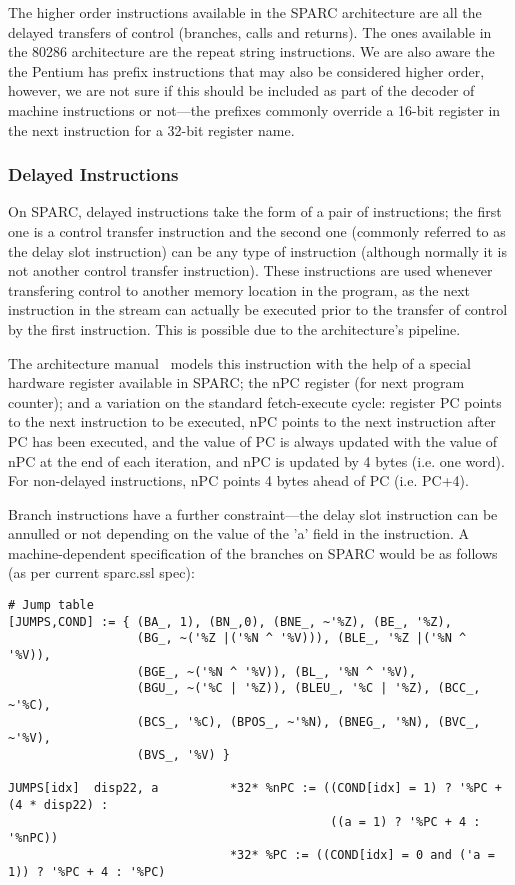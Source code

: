 The higher order instructions available in the SPARC architecture
are all the delayed transfers of control (branches, calls and 
returns).  The ones available in the 80286 architecture are the
repeat string instructions. 
We are also aware the the Pentium has prefix instructions 
that may also be considered higher order, however, we are not
sure if this should be included as part of the decoder of
machine instructions or not---the prefixes commonly override 
a 16-bit register in the next instruction for a 32-bit register
name. 


\subsubsection*{Delayed Instructions}
On SPARC, delayed instructions take the form of a pair of 
instructions; the first one is a control transfer instruction 
and the second one (commonly referred to as the delay slot instruction)
can be any type of instruction (although normally it is not another
control transfer instruction).
These instructions are used whenever transfering control to another 
memory location in the program, as the next instruction in the stream 
can actually be executed prior to the transfer of control by the first 
instruction.  This is possible due to the architecture's pipeline.

The architecture manual~\cite{Spar92} models this instruction with
the help of a special hardware register available in SPARC; the
nPC register (for next program counter); and a variation on
the standard fetch-execute cycle: register PC points to the next
instruction to be executed, nPC points to the next instruction 
after PC has been executed, and the value of PC is always updated
with the value of nPC at the end of each iteration, and nPC is
updated by 4 bytes (i.e. one word).
For non-delayed instructions, nPC points 4 bytes ahead of PC 
(i.e. PC+4).  

Branch instructions have a further constraint---the delay 
slot instruction can be annulled or not depending on the
value of the 'a' field in the instruction.  
A machine-dependent specification of the branches on SPARC
would be as follows (as per current sparc.ssl spec):
{\small
\begin{verbatim}
# Jump table
[JUMPS,COND] := { (BA_, 1), (BN_,0), (BNE_, ~'%Z), (BE_, '%Z),
                  (BG_, ~('%Z |('%N ^ '%V))), (BLE_, '%Z |('%N ^ '%V)),
                  (BGE_, ~('%N ^ '%V)), (BL_, '%N ^ '%V),
                  (BGU_, ~('%C | '%Z)), (BLEU_, '%C | '%Z), (BCC_, ~'%C),
                  (BCS_, '%C), (BPOS_, ~'%N), (BNEG_, '%N), (BVC_, ~'%V),
                  (BVS_, '%V) }

JUMPS[idx]  disp22, a          *32* %nPC := ((COND[idx] = 1) ? '%PC + (4 * disp22) : 
                                             ((a = 1) ? '%PC + 4 : '%nPC))
                               *32* %PC := ((COND[idx] = 0 and ('a = 1)) ? '%PC + 4 : '%PC)
\end{verbatim}
}

